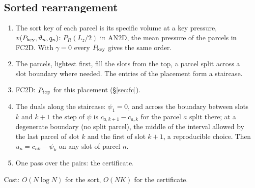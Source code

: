 \documentclass[11pt,a4paper]{article}
\newcommand{\vt}{\vartheta}
\newcommand{\Ptop}{P_{\rm top}}
\begin{document}
\subsection{Sorted rearrangement}\label{sec:sort}
\begin{enumerate}
  \item The sort key of each parcel is its specific volume at a key pressure, $v(P_{\rm key},\vt_n,q_n)$: $P_R(L_z/2)$ in AN2D,
        the mean pressure of the parcels in FC2D. With $\gamma=0$ every $P_{\rm key}$ gives the same order.
  \item The parcels, lightest first, fill the slots from the top, a parcel split across a slot boundary where needed. The
        entries of the placement form a staircase.
  \item FC2D: $\Ptop$ for this placement (\S\ref{sec:fc}).
  \item The duals along the staircase: $\psi_1=0$, and across the boundary between slots $k$ and $k+1$ the step of $\psi$ is
        $c_{a,k+1}-c_{a,k}$ for the parcel $a$ split there; at a degenerate boundary (no split parcel), the middle of the
        interval allowed by the last parcel of slot $k$ and the first of slot $k+1$, a reproducible choice. Then
        $u_n=c_{nk}-\psi_k$ on any slot of parcel $n$.
  \item One pass over the pairs: the certificate.
\end{enumerate}
Cost: $O(N\log N)$ for the sort, $O(NK)$ for the certificate.
\end{document}
